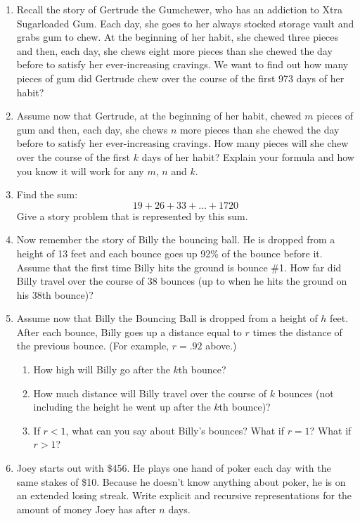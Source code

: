 \newpage
\begin{problems}
\begin{enumerate}


\item Recall the story of Gertrude the Gumchewer, who has an addiction to Xtra Sugarloaded Gum.  Each day, she goes to her always stocked storage vault and grabs gum to chew.  At the beginning of her habit, she chewed three pieces and then, each day, she chews eight more pieces than she chewed the day before to satisfy her ever-increasing cravings. We want to find out how many pieces of gum did Gertrude chew over the course of the first 973 days of her habit?

\item Assume now that Gertrude, at the beginning of her habit, chewed $m$
pieces of gum and then, each day, she chews $n$ more pieces than she
chewed the day before to satisfy her ever-increasing cravings.  How many pieces will she chew over the course of the first $k$
  days of her habit? Explain your formula and how you know it will work for any $m$, $n$ and $k$.  

\item Find the sum:
\[
19 + 26 + 33 + \dots + 1720
\]
Give a story problem that is represented by this sum.

\item Now remember the story of Billy the bouncing ball.  He is dropped from a height of 13 feet and each bounce goes up 92\% of the bounce before it.  Assume that the first time Billy hits the ground is bounce \#1.  How far did Billy travel over the course of 38 bounces (up to when he hits the ground on his 38th bounce)?  

\item Assume now that Billy the Bouncing Ball is dropped from a height of
$h$ feet. After each bounce, Billy goes up a distance equal to $r$
times the distance of the previous bounce. (For example, $r=.92$ above.)
\begin{enumerate}
\item How high will Billy go after the $k$th bounce?
\item How much distance will Billy travel over the course of $k$
  bounces (not including the height he went up after the $k$th
  bounce)?
\item If $r<1$, what can you say about Billy's bounces? What if $r=1$?
  What if $r>1$?
\end{enumerate}

\item Joey starts out with \$456.  He plays one hand of poker each day with the same stakes of \$10.  Because he doesn't know anything about poker, he is on an extended losing streak.  Write explicit and recursive representations for the amount of money Joey has after $n$ days.  
      

\end{enumerate}
\end{problems}
